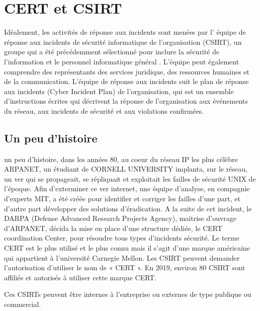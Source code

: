 %
%

\section{CERT et CSIRT}

Idéalement, les activités de réponse aux incidents sont menées par l' équipe de réponse aux incidents de sécurité informatique de l'organisation (CSIRT), un groupe qui a été précédemment sélectionné pour inclure la sécurité de l'information et le personnel informatique général . L'équipe peut également comprendre des représentants des services juridique, des ressources humaines et de la communication. L'équipe de réponse aux incidents suit le plan de réponse aux incidents (Cyber Incident Plan) de l'organisation, qui est un ensemble d'instructions écrites qui décrivent la réponse de l'organisation aux événements du réseau, aux incidents de sécurité et aux violations confirmées.

\subsection{Un peu d'histoire}
un peu d'histoire, dans les années 80, au coeur du réseau IP les plus célèbre ARPANET, un étudiant de CORNELL UNIVERSITY implanta, sur le réseau, un ver  qui se propageait, se répliquait et exploitait les failles de sécurité UNIX de l’époque. Afin d’exterminer ce ver internet, une équipe d’analyse, en compagnie d’experts MIT, a été créée pour identifier et corriger les failles d’une part, et d’autre part développer des solutions d’éradication. A la suite de cet incident, le DARPA (Defense Advanced Research Projects Agency), maitrise d’ouvrage d’ARPANET, décida la mise en place d’une structure dédiée, le CERT coordination Center, pour résoudre tous types d’incidents sécurité. Le terme CERT est le plus utilisé et le plus connu mais il s’agit d’une marque américaine qui appartient à l’université Carnegie Mellon. Les CSIRT peuvent demander l’autorisation d’utiliser le nom de « CERT ». En 2019, environ 80 CSIRT sont affiliés et autorisés à utiliser cette marque CERT.

Ces CSIRTs peuvent être internes à l'entreprise ou externes de type publique ou commercial.

